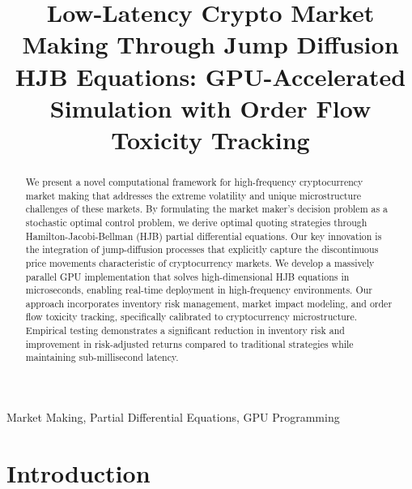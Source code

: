 \documentclass[twocolumn,ieee]{arithmaxresearch}
\begin{document}
\title{Low-Latency Crypto Market Making Through Jump Diffusion HJB Equations: GPU-Accelerated Simulation with Order Flow Toxicity Tracking}


\maketitle

\begin{center}
\vspace{-1em}
\arithmaxtitlelogo[3.5cm]
\vspace{0.5em}
\end{center}

\begin{abstract}
We present a novel computational framework for high-frequency cryptocurrency market making that addresses the extreme volatility and unique microstructure challenges of these markets. By formulating the market maker's decision problem as a stochastic optimal control problem, we derive optimal quoting strategies through Hamilton-Jacobi-Bellman (HJB) partial differential equations. Our key innovation is the integration of jump-diffusion processes that explicitly capture the discontinuous price movements characteristic of cryptocurrency markets. We develop a massively parallel GPU implementation that solves high-dimensional HJB equations in microseconds, enabling real-time deployment in high-frequency environments. Our approach incorporates inventory risk management, market impact modeling, and order flow toxicity tracking, specifically calibrated to cryptocurrency microstructure. Empirical testing demonstrates a significant reduction in inventory risk and improvement in risk-adjusted returns compared to traditional strategies while maintaining sub-millisecond latency.
\end{abstract}

\begin{IEEEkeywords}
Market Making, Partial Differential Equations, GPU Programming
\end{IEEEkeywords}

\section{Introduction}
\end{document}
